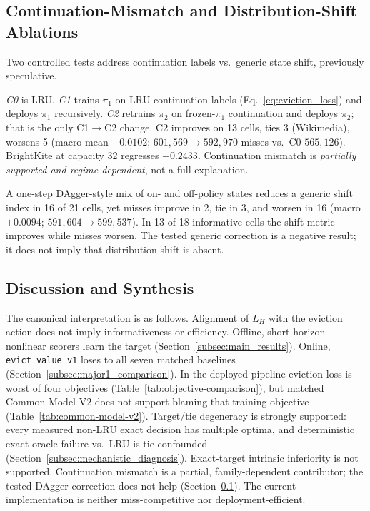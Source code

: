 \documentclass[preprint,12pt]{elsarticle}
\begin{document}
\subsection{Continuation-Mismatch and Distribution-Shift Ablations}
\label{subsec:continuation_ablations}

Two controlled tests address continuation labels vs.\ generic state shift, previously speculative.

\emph{C0} is LRU. \emph{C1} trains $\pi_1$ on LRU-continuation labels (Eq.~\eqref{eq:eviction_loss}) and deploys $\pi_1$ recursively. \emph{C2} retrains $\pi_2$ on frozen-$\pi_1$ continuation and deploys $\pi_2$; that is the only C1$\to$C2 change. C2 improves on 13 cells, ties 3 (Wikimedia), worsens 5 (macro mean $-0.0102$; $601{,}569\to 592{,}970$ misses vs.\ C0 $565{,}126$). BrightKite at capacity 32 regresses $+0.2433$. Continuation mismatch is \emph{partially supported and regime-dependent}, not a full explanation.

A one-step DAgger-style mix of on- and off-policy states reduces a generic shift index in 16 of 21 cells, yet misses improve in 2, tie in 3, and worsen in 16 (macro $+0.0094$; $591{,}604\to 599{,}537$). In 13 of 18 informative cells the shift metric improves while misses worsen. The tested generic correction is a negative result; it does not imply that distribution shift is absent.

\subsection{Discussion and Synthesis}
\label{subsec:discussion_analysis}
\label{subsec:implications}

The canonical interpretation is as follows. Alignment of $L_H$ with the eviction action does not imply informativeness or efficiency. Offline, short-horizon nonlinear scorers learn the target (Section~\ref{subsec:main_results}). Online, \texttt{evict\_value\_v1} loses to all seven matched baselines (Section~\ref{subsec:major1_comparison}). In the deployed pipeline eviction-loss is worst of four objectives (Table~\ref{tab:objective-comparison}), but matched Common-Model V2 does not support blaming that training objective (Table~\ref{tab:common-model-v2}). Target/tie degeneracy is strongly supported: every measured non-LRU exact decision has multiple optima, and deterministic exact-oracle failure vs.\ LRU is tie-confounded (Section~\ref{subsec:mechanistic_diagnosis}). Exact-target intrinsic inferiority is not supported. Continuation mismatch is a partial, family-dependent contributor; the tested DAgger correction does not help (Section~\ref{subsec:continuation_ablations}). The current implementation is neither miss-competitive nor deployment-efficient.
\end{document}
